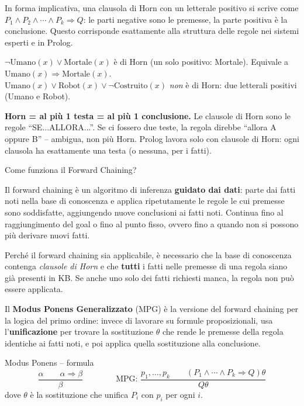 \documentclass[12pt,a4paper]{article}
\begin{document}
In forma implicativa, una clausola di Horn con un letterale positivo si scrive come $P_1 \land P_2 \land \cdots \land P_k \Rightarrow Q$: le parti negative sono le premesse, la parte positiva è la conclusione. Questo corrisponde esattamente alla struttura delle regole nei sistemi esperti e in Prolog.

\begin{esempiobox}
$\neg \text{Umano}(x) \lor \text{Mortale}(x)$ è di Horn (un solo positivo: Mortale). Equivale a $\text{Umano}(x) \Rightarrow \text{Mortale}(x)$.\\
$\text{Umano}(x) \lor \text{Robot}(x) \lor \neg\text{Costruito}(x)$ \emph{non} è di Horn: due letterali positivi (Umano e Robot).
\end{esempiobox}

\begin{ricordabox}
\textbf{Horn = al più 1 testa = al più 1 conclusione.} Le clausole di Horn sono le regole ``SE...ALLORA...''. Se ci fossero due teste, la regola direbbe ``allora A oppure B'' -- ambigua, non più Horn. Prolog lavora solo con clausole di Horn: ogni clausola ha esattamente una testa (o nessuna, per i fatti).
\end{ricordabox}

\begin{domandabox}{Come funziona il Forward Chaining?}
\end{domandabox}

Il forward chaining è un algoritmo di inferenza \textbf{guidato dai dati}: parte dai fatti noti nella base di conoscenza e applica ripetutamente le regole le cui premesse sono soddisfatte, aggiungendo nuove conclusioni ai fatti noti. Continua fino al raggiungimento del goal o fino al punto fisso, ovvero fino a quando non si possono più derivare nuovi fatti.

Perché il forward chaining sia applicabile, è necessario che la base di conoscenza contenga \emph{clausole di Horn} e che \textbf{tutti} i fatti nelle premesse di una regola siano già presenti in KB. Se anche uno solo dei fatti richiesti manca, la regola non può essere applicata.

Il \textbf{Modus Ponens Generalizzato} (MPG) è la versione del forward chaining per la logica del primo ordine: invece di lavorare su formule proposizionali, usa l'\textbf{unificazione} per trovare la sostituzione $\theta$ che rende le premesse della regola identiche ai fatti noti, e poi applica quella sostituzione alla conclusione.

\begin{formulabox}{Modus Ponens -- formula}
\[
\frac{\alpha \qquad \alpha \Rightarrow \beta}{\beta}
\qquad\qquad
\text{MPG: }\frac{p_1,\ldots,p_k \qquad (P_1 \land \cdots \land P_k \Rightarrow Q)\theta}{Q\theta}
\]
dove $\theta$ è la sostituzione che unifica $P_i$ con $p_i$ per ogni $i$.
\end{formulabox}
\end{document}
